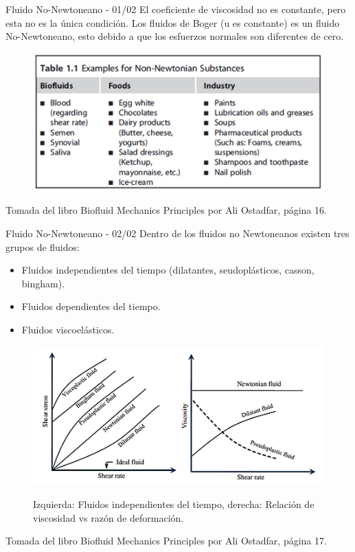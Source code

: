 \begin{frame}{Fluido No-Newtoneano - 01/02}
\justifying
El coeficiente de viscosidad no es constante, pero esta no es la única condición.
Los fluidos de Boger (u es constante) es un fluido No-Newtoneano, esto debido a que los esfuerzos normales son diferentes de cero.
\begin{figure}[H]
\centering
\includegraphics[scale=0.55]{Section_Files/picmanuel/35.png}
\label{fig: Figura2-28}
\end{figure}
{\tiny Tomada del libro Biofluid Mechanics Principles por Ali Ostadfar, página 16.}
\end{frame}

\begin{frame}{Fluido No-Newtoneano - 02/02}
\justifying
Dentro de los fluidos no Newtoneanos existen tres grupos de fluidos:
\begin{itemize}
\item Fluidos independientes del tiempo (dilatantes, seudoplásticos, casson, bingham).
\item Fluidos dependientes del tiempo.
\item Fluidos viscoelásticos.
\end{itemize}
\begin{figure}[H]
\centering
\includegraphics[scale=0.45]{Section_Files/picmanuel/36.png}
\label{fig: Figura2-29}
\caption{Izquierda: Fluidos independientes del tiempo, derecha: Relación de viscosidad vs razón de deformación.}
\end{figure}
{\tiny Tomada del libro Biofluid Mechanics Principles por Ali Ostadfar, página 17.}
\end{frame}

